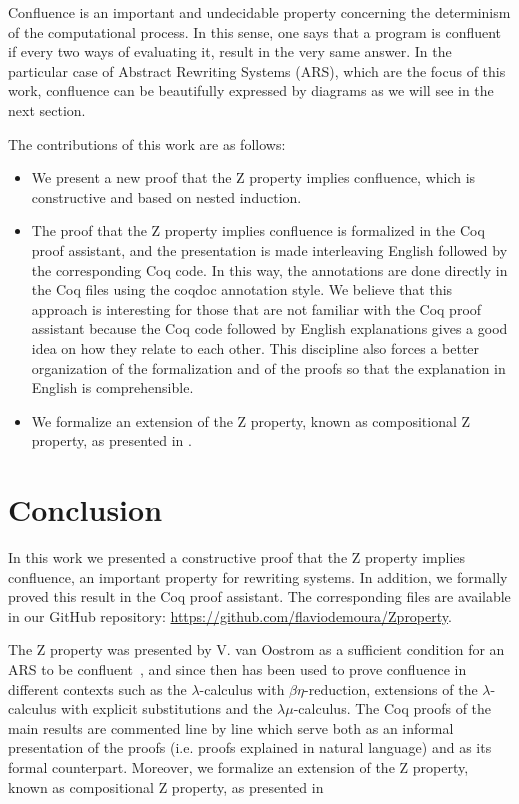 \documentclass{llncs}
\begin{document}
Confluence is an important and undecidable property concerning the
determinism of the computational process. In this sense, one says that
a program is confluent if every two ways of evaluating it, result in
the very same answer. In the particular case of Abstract Rewriting
Systems (ARS), which are the focus of this work, confluence can be
beautifully expressed by diagrams as we will see in the next section.

The contributions of this work are as follows:
\begin{itemize}
\item We present a new proof that the Z property implies confluence,
  which is constructive and based on nested induction.
\item The proof that the Z property implies confluence is formalized
  in the Coq proof assistant, and the presentation is made
  interleaving English followed by the corresponding Coq code. In this
  way, the annotations are done directly in the Coq files using the
  coqdoc annotation style. We believe that this approach is
  interesting for those that are not familiar with the Coq proof
  assistant because the Coq code followed by English explanations
  gives a good idea on how they relate to each other. This discipline
  also forces a better organization of the formalization and of the
  proofs so that the explanation in English is comprehensible.
\item We formalize an extension of the Z property, known as
  compositional Z property, as presented in
  \cite{Nakazawa-Fujita2016}.
\end{itemize}




\section{Conclusion}

In this work we presented a constructive proof that the Z property
implies confluence, an important property for rewriting systems. In
addition, we formally proved this result in the Coq proof
assistant. The corresponding files are available in our GitHub
repository: \url{https://github.com/flaviodemoura/Zproperty}.

The Z property was presented by V. van Oostrom as a sufficient
condition for an ARS to be confluent~\cite{zproperty}, and since
then has been used to prove confluence in different contexts such as
the $\lambda$-calculus with $\beta\eta$-reduction, extensions of the
$\lambda$-calculus with explicit substitutions and the
$\lambda\mu$-calculus. The Coq proofs of the main results are
commented line by line which serve both as an informal presentation of
the proofs (i.e. proofs explained in natural language) and as its
formal counterpart. Moreover, we formalize an extension of the Z
property, known as compositional Z property, as presented in
\cite{Nakazawa-Fujita2016}
\end{document}
